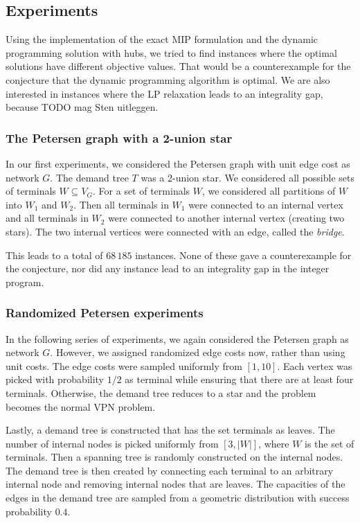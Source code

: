 \subsection{Experiments}
Using the implementation of the exact MIP formulation and the dynamic programming solution with hubs, we tried to find instances where the optimal solutions have different objective values.
That would be a counterexample for the conjecture that the dynamic programming algorithm is optimal.
We are also interested in instances where the LP relaxation leads to an integrality gap, because TODO mag Sten uitleggen. %

\subsubsection{The Petersen graph with a 2-union star}
In our first experiments, we considered the Petersen graph with unit edge cost as network $G$.
The demand tree $T$ was a 2-union star.
We considered all possible sets of terminals $W \subseteq V_G$.
For a set of terminals $W$, we considered all partitions of $W$ into $W_1$ and $W_2$.
Then all terminals in $W_1$ were connected to an internal vertex and all terminals in $W_2$ were connected to another internal vertex (creating two stars).
The two internal vertices were connected with an edge, called the \emph{bridge}.

This leads to a total of $68\,185$ instances.
None of these gave a counterexample for the conjecture, nor did any instance lead to an integrality gap in the integer program.

\subsubsection{Randomized Petersen experiments}\label{subsubsec:random}
In the following series of experiments, we again considered the Petersen graph as network $G$.
However, we assigned randomized edge costs now, rather than using unit costs.
The edge costs were sampled uniformly from $[1, 10]$.
Each vertex was picked with probability $1/2$ as terminal while ensuring that there are at least four terminals.
Otherwise, the demand tree reduces to a star and the problem becomes the normal VPN problem.

Lastly, a demand tree is constructed that has the set terminals as leaves.
The number of internal nodes is picked uniformly from $[3, |W|]$, where $W$ is the set of terminals.
Then a spanning tree is randomly constructed on the internal nodes.
The demand tree is then created by connecting each terminal to an arbitrary internal node and removing internal nodes that are leaves.
The capacities of the edges in the demand tree are sampled from a geometric distribution with success probability $0.4$.

